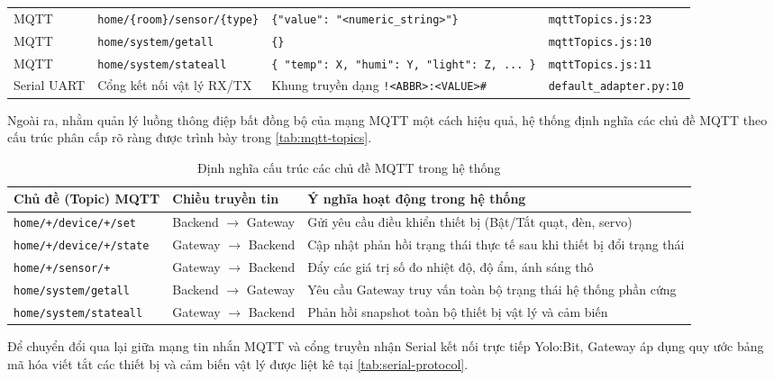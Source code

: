 \begin{longtable}{p{2.5cm} p{5.5cm} p{4.5cm} p{3.0cm}}
MQTT & \texttt{home/\{room\}/sensor/\{type\}} & \texttt{\{"value": "<numeric\_string>"\}} & \texttt{mqttTopics.js:23} \\
MQTT & \texttt{home/system/getall} & \texttt{\{\}} & \texttt{mqttTopics.js:10} \\
MQTT & \texttt{home/system/stateall} & \texttt{\{ "temp": X, "humi": Y, "light": Z, ... \}} & \texttt{mqttTopics.js:11} \\
\midrule
Serial UART & Cổng kết nối vật lý RX/TX & Khung truyền dạng \texttt{!<ABBR>:<VALUE>\#} & \texttt{default\_adapter.py:10} \\
\end{longtable}

Ngoài ra, nhằm quản lý luồng thông điệp bất đồng bộ của mạng MQTT một cách hiệu quả, hệ thống định nghĩa các chủ đề MQTT theo cấu trúc phân cấp rõ ràng được trình bày trong \autoref{tab:mqtt-topics}.

\begin{table}[H]
\centering
\caption{Định nghĩa cấu trúc các chủ đề MQTT trong hệ thống}
\label{tab:mqtt-topics}
\begin{tabular}{p{5.5cm} p{3.5cm} p{6.0cm}}
\toprule
\textbf{Chủ đề (Topic) MQTT} & \textbf{Chiều truyền tin} & \textbf{Ý nghĩa hoạt động trong hệ thống} \\
\midrule
\texttt{home/+/device/+/set} & Backend $\rightarrow$ Gateway & Gửi yêu cầu điều khiển thiết bị (Bật/Tắt quạt, đèn, servo) \\
\texttt{home/+/device/+/state} & Gateway $\rightarrow$ Backend & Cập nhật phản hồi trạng thái thực tế sau khi thiết bị đổi trạng thái \\
\texttt{home/+/sensor/+} & Gateway $\rightarrow$ Backend & Đẩy các giá trị số đo nhiệt độ, độ ẩm, ánh sáng thô \\
\texttt{home/system/getall} & Backend $\rightarrow$ Gateway & Yêu cầu Gateway truy vấn toàn bộ trạng thái hệ thống phần cứng \\
\texttt{home/system/stateall} & Gateway $\rightarrow$ Backend & Phản hồi snapshot toàn bộ thiết bị vật lý và cảm biến \\
\bottomrule
\end{tabular}
\end{table}

Để chuyển đổi qua lại giữa mạng tin nhắn MQTT và cổng truyền nhận Serial kết nối trực tiếp Yolo:Bit, Gateway áp dụng quy ước bảng mã hóa viết tắt các thiết bị và cảm biến vật lý được liệt kê tại \autoref{tab:serial-protocol}.

